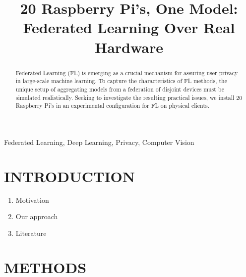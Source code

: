 \documentclass{article}
\title{20 Raspberry Pi's, One Model: Federated Learning Over Real Hardware}
\begin{document}
%

\maketitle
%
\begin{abstract}
    Federated Learning (FL) is emerging as a crucial mechanism for assuring user privacy in large-scale machine learning.
    To capture the characteristics of FL methods, the unique setup of aggregating models from a federation of disjoint devices must be simulated realistically.
    Seeking to investigate the resulting practical issues, we install 20 Raspberry Pi's in an experimental configuration for FL on physical clients.
\end{abstract}
%
\begin{keywords}
    Federated Learning, Deep Learning, Privacy, Computer Vision
\end{keywords}

\section{INTRODUCTION}
\label{sec:intro}
\cite{kai2021advances}
\begin{enumerate}
    \item Motivation
    \item Our approach
    \item Literature
\end{enumerate}


\section{METHODS}%
\label{sec:methods}
\end{document}
